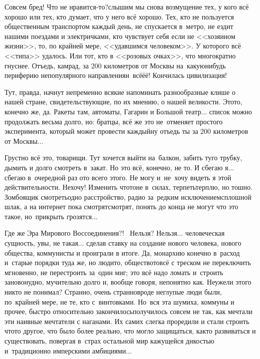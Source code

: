 \diagdash Совсем бред! Что не нравится-то?\mdash слышим мы снова возмущение тех, у кого всё хорошо или тех, кто думает, что у него всё хорошо. Тех, кто не пользуется общественным транспортом каждый день, не спускается в~метро, не ездит нашими поездами и электричками, кто чувствует себя если не <<хозяином жизни>>, то, по крайней мере, <<удавшимся человеком>>. У которого всё <<типа>> удалось. Или тот, кто в <<розовых очках>>, что многократно гнуснее. Отъедь, камрад, за 200 километров от Москвы на~какую\sdash нибудь периферию непопулярного направления\mdash и~всё\sdash ё\sdash ё! Кончилась цивилизация! 

Тут, правда, начнут непременно всякие напоминать разнообразные клише о нашей стране, свидетельствующие, по их мнению, о нашей великости. Это\sdash то, конечно же, да. Ракеты там, автоматы, Гагарин и Большой театр$\ldots$ список можно продолжать весьма долго, но: братцы, всё же это не~отменяет простого эксперимента, который может провести каждый\mdash ну отъедь ты за 200 километров от Москвы$\ldots$

Грустно всё это, товарищи. Тут хочется выйти на~балкон, забить туго трубку, дымить и долго смотреть в~закат. Но это всё, конечно, не то. И сбегаю я$\ldots$ сбегаю в~очередной раз ото всего этого. Не могу и~не~хочу видеть я этой действительности. Не\sdash хо\sdash чу! Изменить что\sdash то\mdash не в~силах, терпеть\mdash терплю, но тошно. Зомбоящик смотреть\mdash одно расстройство, радио за~редким исключением\mdash сплошной шлак, а на интернет пока смотрят\sdash смотрят, понять до конца не могут что это такое, но~прикрыть грозятся$\ldots$

Где же Эра Мирового Воссоединения?!~\cite{ТуманностьАндромеды} Нельзя? Нельзя$\ldots$ человеческая сущность, увы, не такая$\ldots$ сделав ставку на создание нового человека, нового общества, коммунисты и проиграли в итоге. Да, монархию конечно в~расход и~старые порядки туда же, но люди\sdash то, общество\sdash то\mdash всё с треском не переключить мгновенно, не перестроить за~один миг; это всё надо ломать и~строить заново\mdash нудно, мучительно долго и, вообще говоря, непонятно как. Неужели этого никто не понимал? Странно, очень странно\mdash вроде неглупые люди были, по~крайней мере, не те, кто с~винтовками. Но~вся эта шумиха, коммуны и прочее, быстро относительно закончилось\mdash получилось совсем не так, как мечтали эти наивные мечтатели с наганами. Их самих слегка проредили и стали строить что\sdash то другое, что было более реально, что могло защищаться, как\sdash то развиваться и существовать, повергая в~страх остальной мир кажущейся дикостью и~традиционно имперскими амбициями$\ldots$

